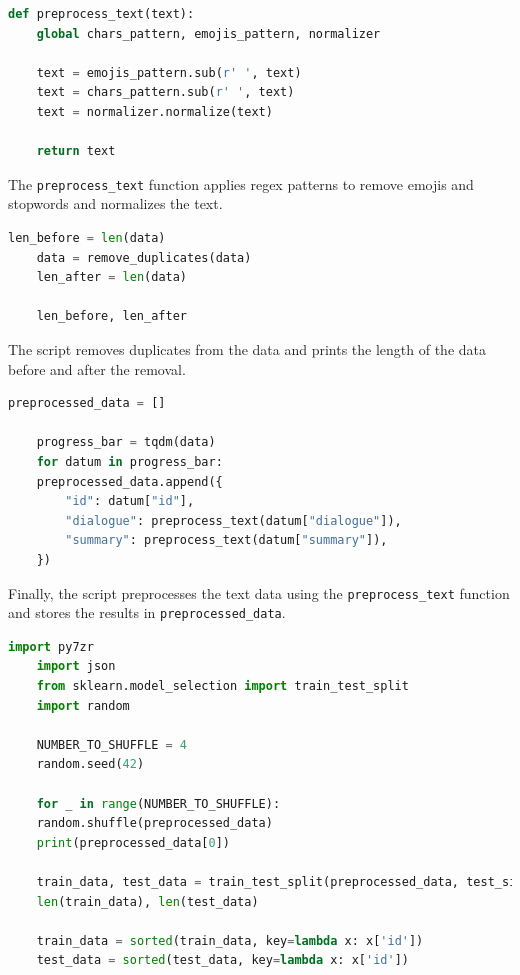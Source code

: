 \documentclass{solutionclass} %
\begin{document}
\begin{lstlisting}[language=Python]
	def preprocess_text(text):
	global chars_pattern, emojis_pattern, normalizer
	
	text = emojis_pattern.sub(r' ', text)
	text = chars_pattern.sub(r' ', text)
	text = normalizer.normalize(text)
	
	return text
\end{lstlisting}


\begin{solution}
The \texttt{preprocess\_text} function applies regex patterns to remove emojis and stopwords and normalizes the text.
\end{solution}


\begin{lstlisting}[language=Python]
	len_before = len(data)
	data = remove_duplicates(data)
	len_after = len(data)
	
	len_before, len_after
\end{lstlisting}

\begin{solution}
The script removes duplicates from the data and prints the length of the data before and after the removal.
\end{solution}


\begin{lstlisting}[language=Python]
	preprocessed_data = []
	
	progress_bar = tqdm(data)
	for datum in progress_bar:
	preprocessed_data.append({
		"id": datum["id"],
		"dialogue": preprocess_text(datum["dialogue"]),
		"summary": preprocess_text(datum["summary"]),
	})
\end{lstlisting}

\begin{solution}
Finally, the script preprocesses the text data using the \texttt{preprocess\_text} function and stores the results in \texttt{preprocessed\_data}.
\end{solution}



\begin{lstlisting}[language=Python]
	import py7zr
	import json
	from sklearn.model_selection import train_test_split
	import random
	
	NUMBER_TO_SHUFFLE = 4
	random.seed(42)
	
	for _ in range(NUMBER_TO_SHUFFLE):
	random.shuffle(preprocessed_data)
	print(preprocessed_data[0])
	
	train_data, test_data = train_test_split(preprocessed_data, test_size=0.1, random_state=42)
	len(train_data), len(test_data)
	
	train_data = sorted(train_data, key=lambda x: x['id'])
	test_data = sorted(test_data, key=lambda x: x['id'])
\end{lstlisting}
\end{document}
